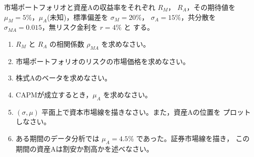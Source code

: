 \begin{exercise}[問題2]
市場ポートフォリオと資産Aの収益率をそれぞれ $R_M$， $R_A$，その期待値を
$\mu_M = 5\%$，$\mu_A$(未知)，標準偏差を $\sigma_M = 20\%$，
$\sigma_A = 15\%$，共分散を $\sigma_{MA} = 0.015$，無リスク金利を $r = 4\%$ と
する。
\begin{enumerate}
\item[(1)] $R_M$ と $R_A$ の相関係数 $\rho_{MA}$ を求めなさい。
\item[(2)] 市場ポートフォリオのリスクの市場価格を求めなさい。
\item[(3)] 株式Aのベータを求めなさい。
\item[(4)] CAPMが成立するとき，$\mu_A$ を求めなさい。
\item[(5)] $(\sigma,\mu)$ 平面上で資本市場線を描きなさい。また，資産Aの位置を
プロットしなさい。
\item[(6)] ある期間のデータ分析では $\mu_A = 4.5\%$ であった。証券市場線を描き，
この期間の資産Aは割安か割高かを述べなさい。
\end{enumerate}
\end{exercise}

